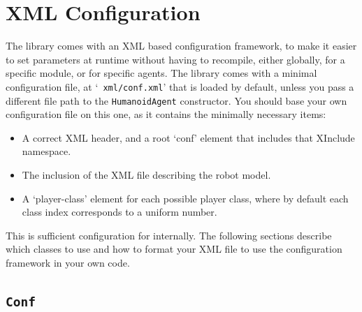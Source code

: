 \section{XML Configuration}
\label{sec:xml-configuration}

The \libbats library comes with an XML based configuration framework,
to make it easier to set parameters at runtime without having to
recompile, either globally, for a specific module, or for specific
agents. The library comes with a minimal configuration file, at `{\tt
  xml/conf.xml}' that is loaded by default, unless you pass a
different file path to the {\tt HumanoidAgent} constructor. You should
base your own configuration file on this one, as it contains the minimally necessary items:
\begin{itemize}
\item A correct XML header, and a root `conf' element that includes
  that XInclude namespace.
\item The inclusion of the XML file describing the robot model.
\item A `player-class' element for each possible player class, where
  by default each class index corresponds to a uniform number.
\end{itemize}
This is sufficient configuration for \libbats internally. The
following sections describe which classes to use and how to format
your XML file to use the configuration framework in your own code.

\subsection{{\tt Conf}}
\label{sec:tt-conf}

